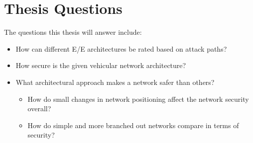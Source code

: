 \section{Thesis Questions}\label{sec:thesis-questions}

The questions this thesis will answer include:

\begin{itemize}
    \item How can different E/E architectures be rated based on attack paths?
    \item How secure is the given vehicular network architecture?
    \item What architectural approach makes a network safer than others?
    \begin{itemize}
        \item How do small changes in network positioning affect the network security overall?
        \item How do simple and more branched out networks compare in terms of security?
    \end{itemize}
\end{itemize}




